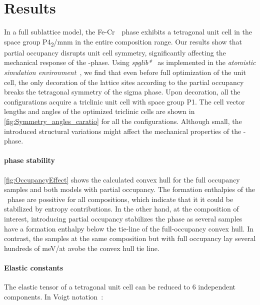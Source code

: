 \documentclass[superscriptaddress, 12pt]{revtex4-2}%
\begin{document}
\section{Results}

In a full sublattice model, the Fe-Cr~\textsigma~phase exhibits a tetragonal unit cell in the space group P4\textsubscript{2}/mnm in the entire composition range.  
Our results show that partial occupancy disrupts unit cell symmetry, significantly affecting the mechanical response of the \textsigma-phase.  
Using \textit{spglib*}~\cite{Spglib_Togo} as implemented in the \textit{atomistic simulation environment}~\cite{HjorthLarsen_2017}, we find that even before full optimization of the unit cell, the only decoration of the lattice  sites according to the partial occupancy breaks the tetragonal symmetry of the sigma phase.  
Upon decoration, all the configurations acquire a triclinic unit cell with space group P1. 
The cell vector lengths and angles of the optimized triclinic cells are shown in \autoref{fig:Symmetry_angles_caratio} for all the configurations.  
Although small, the introduced structural variations might affect the mechanical properties of the \textsigma -phase. 

\paragraph{phase stability}

\autoref{fig:OccupancyEffect} shows the calculated convex hull for the full occupancy samples and both models with
partial occupancy. 
The formation enthalpies of the \textsigma~phase are possitive for all compositions, which indicate that it it could be stabilized by entropy contributions. 
In the other hand, at the composition of interest, introducing partial occupancy stabilizes the phase as several samples have a formation enthalpy below the tie-line of the full-occupancy convex hull. 
In contrast, the samples at the same composition but with full occupancy lay several hundreds of meV/at avobe the convex hull tie line.

\paragraph{Elastic constants}

The elastic tensor of a tetragonal unit cell can be reduced to 6 independent components.
In Voigt notation~\cite{golesorkhtabar_elastic_2013}:
\end{document}
